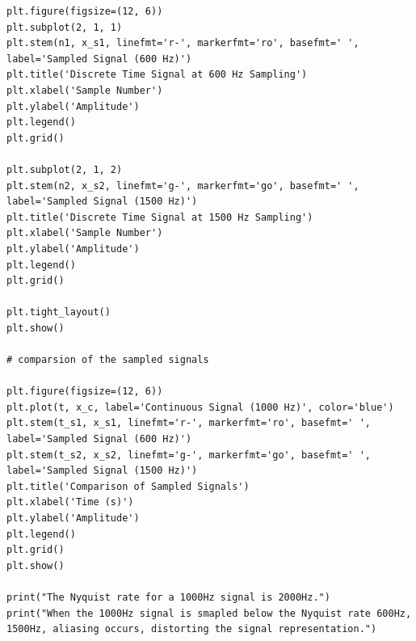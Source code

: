 \documentclass[11pt, a4paper]{article}
\begin{document}
\begin{lstlisting}[caption={Aliasing Demonstration -- Assignment 1}]
plt.figure(figsize=(12, 6))
plt.subplot(2, 1, 1)
plt.stem(n1, x_s1, linefmt='r-', markerfmt='ro', basefmt=' ', label='Sampled Signal (600 Hz)')
plt.title('Discrete Time Signal at 600 Hz Sampling')
plt.xlabel('Sample Number')
plt.ylabel('Amplitude')
plt.legend()
plt.grid()

plt.subplot(2, 1, 2)
plt.stem(n2, x_s2, linefmt='g-', markerfmt='go', basefmt=' ', label='Sampled Signal (1500 Hz)')
plt.title('Discrete Time Signal at 1500 Hz Sampling')
plt.xlabel('Sample Number')
plt.ylabel('Amplitude')
plt.legend()
plt.grid()

plt.tight_layout()
plt.show()  

# comparsion of the sampled signals

plt.figure(figsize=(12, 6))
plt.plot(t, x_c, label='Continuous Signal (1000 Hz)', color='blue')
plt.stem(t_s1, x_s1, linefmt='r-', markerfmt='ro', basefmt=' ', label='Sampled Signal (600 Hz)')
plt.stem(t_s2, x_s2, linefmt='g-', markerfmt='go', basefmt=' ', label='Sampled Signal (1500 Hz)')
plt.title('Comparison of Sampled Signals')
plt.xlabel('Time (s)')
plt.ylabel('Amplitude')
plt.legend()
plt.grid()
plt.show()

print("The Nyquist rate for a 1000Hz signal is 2000Hz.")
print("When the 1000Hz signal is smapled below the Nyquist rate 600Hz, 1500Hz, aliasing occurs, distorting the signal representation.")
\end{lstlisting}
\end{document}
